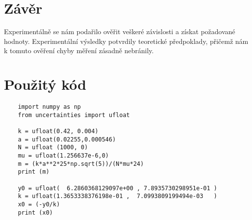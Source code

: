 \documentclass[czech,11pt,a4paper]{article}
\begin{document}
	\section{Závěr}
	Experimentálně se nám podařilo ověřit veškeré závislosti a získat požadované hodnoty. Experimentální výsledky potvrdily teoretické předpoklady, přičemž nám k tomuto ověření chyby měření zásadně nebránily.
	
	
	\section{Použitý kód}
	{\tiny \begin{verbatim}
	import numpy as np
	from uncertainties import ufloat
	
	k = ufloat(0.42, 0.004)  
	a = ufloat(0.02255,0.000546)
	N = ufloat (1000, 0)
	mu = ufloat(1.256637e-6,0)
	m = (k*a**2*25*np.sqrt(5))/(N*mu*24)
	print (m)
	
	y0 = ufloat(  6.2860368129097e+00 , 7.8935730298951e-01 )  
	k = ufloat(1.3653338376198e-01 ,  7.0993809199494e-03   )
	x0 = (-y0/k)
	print (x0)
	\end{verbatim}}

	

	
	
\end{document}
